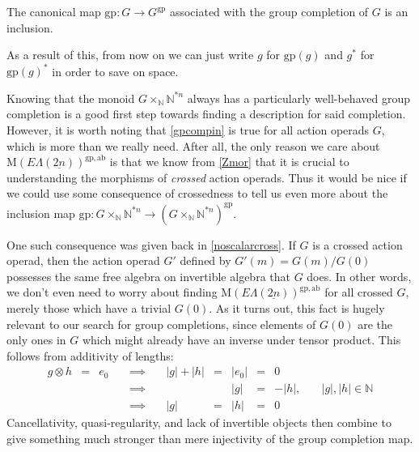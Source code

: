 \documentclass{amsbook} %
\newcommand{\ELnn}{E\Lambda(\underline{2n})}
\numberwithin{section}{chapter}
\begin{document}
\begin{cor} \label{gpcompin} The canonical map $\mathrm{gp} : G \to G^{\mathrm{gp}}$ associated with the group completion of $G$ is an inclusion.
\end{cor}

As a result of this, from now on we can just write $g$ for $\mathrm{gp}(g)$ and $g^*$ for $\mathrm{gp}(g)^*$ in order to save on space.

Knowing that the monoid $G \times_{\mathbb{N}} \mathbb{N}^{\ast n}$ always has a particularly well-behaved group completion is a good first step towards finding a description for said completion. However, it is worth noting that \cref{gpcompin} is true for all action operads $G$, which is more than we really need. After all, the only reason we care about $\mathrm{M}(\ELnn)^{\mathrm{gp},\mathrm{ab}}$ is that we know from \cref{Zmor} that it is crucial to understanding the morphisms of \emph{crossed} action operads. Thus it would be nice if we could use some consequence of crossedness to tell us even more about the inclusion map $\mathrm{gp} : G \times_{\mathbb{N}} \mathbb{N}^{\ast n} \to {(G \times_{\mathbb{N}} \mathbb{N}^{\ast n})}^{\mathrm{gp}}$.

One such consequence was given back in \cref{noscalarcross}. If $G$ is a crossed action operad, then the action operad $G'$ defined by $G'(m) = G(m)/G(0)$ possesses the same free algebra on invertible algebra that $G$ does. In other words, we don't even need to worry about finding $\mathrm{M}(\ELnn)^{\mathrm{gp},\mathrm{ab}}$ for all crossed $G$, merely those which have a trivial $G(0)$. As it turns out, this fact is hugely relevant to our search for group completions, since elements of $G(0)$ are the only ones in $G$ which might already have an inverse under tensor product. This follows from additivity of lengths:
\[ \begin{array}{rclcrcccll}
			g \otimes h & = & e_0 & \quad \implies \quad & |g| + |h| & = & |e_0| & = & 0 & \\
			& & & \quad \implies \quad & & & |g| & = & -|h|, & \quad |g|, |h| \in \mathbb{N} \\
			& & & \quad \implies \quad & |g| & = & |h| & = & 0& 
		\end{array}
\]
Cancellativity, quasi-regularity, and lack of invertible objects then combine to give something much stronger than mere injectivity of the group completion map.
\end{document}
